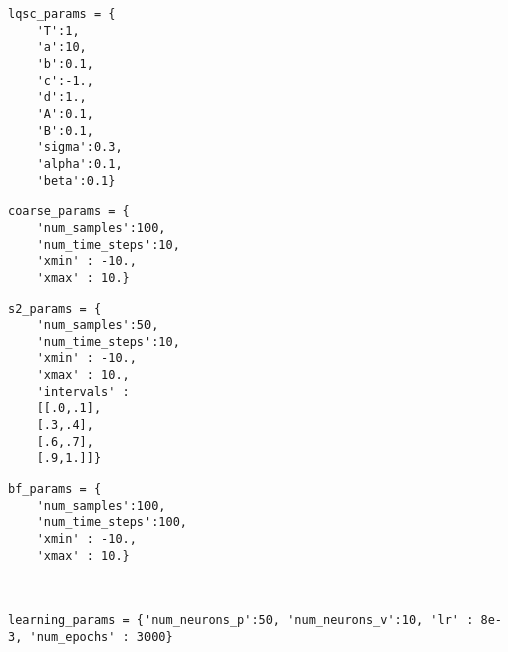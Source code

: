 \documentclass[border=4pt,preview]{standalone}
\begin{document}
\begin{scriptsize}
\begin{minipage}[t]{0.2\textwidth}
\begin{verbatim}
lqsc_params = {
    'T':1, 
    'a':10, 
    'b':0.1, 
    'c':-1., 
    'd':1., 
    'A':0.1, 
    'B':0.1, 
    'sigma':0.3, 
    'alpha':0.1, 
    'beta':0.1}
\end{verbatim}   
\end{minipage}
\begin{minipage}[t]{0.25\textwidth}
\begin{verbatim}    
coarse_params = {
    'num_samples':100, 
    'num_time_steps':10, 
    'xmin' : -10., 
    'xmax' : 10.}
\end{verbatim}   
\end{minipage}
\begin{minipage}[t]{0.25\textwidth}
\begin{verbatim} 
s2_params = {
    'num_samples':50, 
    'num_time_steps':10, 
    'xmin' : -10., 
    'xmax' : 10.,
    'intervals' : 
    [[.0,.1], 
    [.3,.4], 
    [.6,.7], 
    [.9,1.]]}   
\end{verbatim}   
\end{minipage}
\begin{minipage}[t]{0.25\textwidth}
\begin{verbatim}     
bf_params = {
    'num_samples':100, 
    'num_time_steps':100, 
    'xmin' : -10., 
    'xmax' : 10.}
\end{verbatim}   
\end{minipage}\\
\begin{minipage}{1\textwidth}
\begin{verbatim} 
learning_params = {'num_neurons_p':50, 'num_neurons_v':10, 'lr' : 8e-3, 'num_epochs' : 3000}
\end{verbatim}
\end{minipage}
\end{scriptsize}
\end{document}
